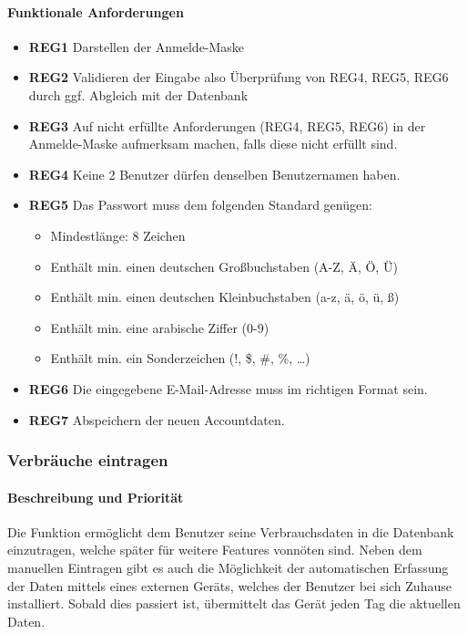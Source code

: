\paragraph{Funktionale Anforderungen}
\begin{itemize}
	\item \textbf{REG1} Darstellen der Anmelde-Maske
	\item \textbf{REG2} Validieren der Eingabe also Überprüfung von REG4, REG5, REG6
	      durch ggf. Abgleich mit der Datenbank
	\item \textbf{REG3} Auf nicht erfüllte Anforderungen (REG4, REG5, REG6) in der Anmelde-Maske aufmerksam machen,
	      falls diese nicht erfüllt sind.
	\item \textbf{REG4} Keine 2 Benutzer dürfen denselben Benutzernamen haben.
	\item \textbf{REG5} Das Passwort muss dem folgenden Standard genügen:
	      \begin{itemize}
		      \item Mindestlänge: 8 Zeichen
		      \item Enthält min. einen deutschen Großbuchstaben (A-Z, Ä, Ö, Ü)
		      \item Enthält min. einen deutschen Kleinbuchstaben (a-z, ä, ö, ü, ß)
		      \item Enthält min. eine arabische Ziffer (0-9)
		      \item Enthält min. ein Sonderzeichen (!, \$, \#, \%, \ldots)
	      \end{itemize}
	\item \textbf{REG6} Die eingegebene E-Mail-Adresse muss im richtigen Format sein.
	\item \textbf{REG7} Abspeichern der neuen Accountdaten.

\end{itemize}

\subsubsection{Verbräuche eintragen}
\label{sysf:verb_eintragen}
\paragraph{Beschreibung und Priorität}
Die Funktion ermöglicht dem Benutzer seine Verbrauchsdaten in die Datenbank einzutragen,
welche später für weitere Features vonnöten sind.
Neben dem manuellen Eintragen gibt es auch die Möglichkeit der automatischen Erfassung der Daten
mittels eines externen Geräts, welches der Benutzer bei sich Zuhause installiert.
Sobald dies passiert ist, übermittelt das Gerät jeden Tag die aktuellen Daten.

